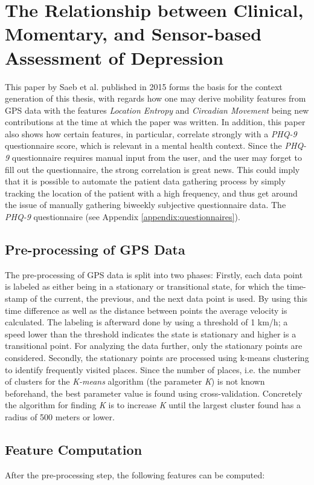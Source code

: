 \section{The Relationship between Clinical, Momentary, and Sensor-based Assessment of Depression}
This paper by Saeb et al. published in 2015 \cite{Saeb2015} forms the basis for the context generation of this thesis, with regards how one may derive mobility features from GPS data with the features \textit{Location Entropy} and \textit{Circadian Movement} being new contributions at the time at which the paper was written. In addition, this paper also shows how certain features, in particular, correlate strongly with a \textit{PHQ-9} questionnaire score, which is relevant in a mental health context. Since the \textit{PHQ-9} questionnaire requires manual input from the user, and the user may forget to fill out the questionnaire, the strong correlation is great news. This could imply that it is possible to automate the patient data gathering process by simply tracking the location of the patient with a high frequency, and thus get around the issue of manually gathering biweekly subjective questionnaire data. The \textit{PHQ-9} questionnaire (see Appendix \ref{appendix:questionnaires}).

\subsection{Pre-processing of GPS Data}
The pre-processing of GPS data is split into two phases:  Firstly, each data point is labeled as either being in a stationary or transitional state, for which the time-stamp of the current, the previous, and the next data point is used. By using this time difference as well as the distance between points the average velocity is calculated. The labeling is afterward done by using a threshold of 1 km/h; a speed lower than the threshold indicates the state is stationary and higher is a transitional point. For analyzing the data further, only the stationary points are considered. Secondly, the stationary points are processed using k-means clustering to identify frequently visited places. Since the number of places, i.e. the number of clusters for the \textit{K-means} algorithm (the parameter \textit{K}) is not known beforehand, the best parameter value is found using cross-validation. Concretely the algorithm for finding \textit{K} is to increase \textit{K} until the largest cluster found has a radius of 500 meters or lower.

\subsection{Feature Computation}
\label{ref:features-saeb2015}
After the pre-processing step, the following features can be computed:\\

